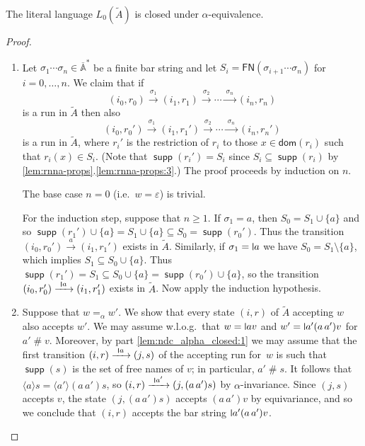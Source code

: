 \documentclass[final,a4paper,UKenglish,thm-restate,autoref,numberwithinsect]{lipics-v2021}
\newcommand{\midmid}{\hspace{0.2ex}{\rule[-0.1ex]{0.6pt}{1.65ex}}\hspace{0.2ex}}
\newcommand{\scriptmidmid}{\hspace{0.2ex}{\rule[-0.1ex]{0.6pt}{1.1ex}}\hspace{0.2ex}}
\newcommand{\newletter}[1]{{\midmid}#1}
\newcommand{\scriptnew}[1]{{\scriptmidmid}#1}
\newcommand{\free}[1]{\mathsf{FN}(#1)}
\newcommand{\barA}{\overline{\names}}
\numberwithin{equation}{section}
\newcommand{\xto}[1]{\xrightarrow{~#1~}}
\newcommand{\seq}{\subseteq}
\newcommand{\tl}{\widetilde}
\newcommand{\braket}[1]{\langle #1 \rangle}
\renewcommand{\epsilon}{\varepsilon}
\newcommand{\+}[1]{\mathcal{#1}\xspace}
\newcommand{\names}{\mathbb{A}}
\DeclareMathOperator{\supp}{\mathsf{supp}} %
\newcommand{\fresh}{\mathbin{\#}}
\theoremstyle{definition}
\begin{document}
\begin{lemma}\label{lem:ndc_alpha_closed}
  The literal language $L_0(\tl A)$ is closed under $\alpha$-equivalence.
\end{lemma}
%
\begin{proof}
  \begin{enumerate}
  \item\label{lem:ndc_alpha_closed:1} Let
    $\sigma_1\cdots \sigma_n\in \barA^*$ be a finite bar string and
    let $S_i=\free{\sigma_{i+1}\cdots \sigma_n}$ for
    $i=0,\ldots,n$. We claim that if
    \[
      (i_0,r_0)\xto{\sigma_1} (i_1, r_1)\xto{\sigma_2} \cdots \xto{\sigma_n} (i_n, r_n)
    \]
    is a run in $\tl{A}$ then also
    \[
      (i_0,r_0')\xto{\sigma_1} (i_1, r_1')\xto{\sigma_2} \cdots \xto{\sigma_n}
      (i_n, r_n')
    \]
    is a run in $\tl{A}$, where $r_i'$ is the restriction of $r_i$ to
    those $x\in \mathsf{dom}(r_i)$ such that $r_i(x)\in S_i$. (Note that
    $\supp(r_i')=S_i$ since $S_i\seq \supp(r_i)$ by \autoref{lem:rnna-props}.\ref{lem:rnna-props:3}.) The proof proceeds by
    induction on $n$.

    \smallskip\noindent The base case $n=0$ (i.e.~$w=\epsilon$) is
    trivial.
  
    \smallskip\noindent For the induction step, suppose that
    $n\geq 1$. If $\sigma_1=a$, then $S_0=S_1\cup \{a\}$ and so
    $\supp(r_1')\cup \{a\}=S_1\cup \{a\}\seq S_0 =\supp(r_0')$. Thus
    the transition $(i_0,r_0')\xto{a}(i_1,r_1')$ exists in
    $\tl{A}$. Similarly, if $\sigma_1=\newletter a$ we have
    $S_0=S_1\setminus \{a\}$, which implies $S_1\seq S_0\cup
    \{a\}$. Thus
    $\supp(r_1')=S_1 \seq S_0\cup \{a\} = \supp(r_0')\cup \{a\}$, so
    the transition $(i_0,r_0')\xto{\scriptnew a}(i_1,r_1')$ exists in
    $\tl{A}$. Now apply the induction hypothesis.

  \item Suppose that $w=_\alpha w'$. We show that every state $(i,r)$ of
    $\tl{A}$ accepting $w$ also accepts $w'$. We may assume w.l.o.g.\
    that $w=\newletter av$ and $w'=\newletter a'(a\, a')v$ for $a'\fresh v$. Moreover, by
    part \ref{lem:ndc_alpha_closed:1} we may assume that the
    first transition $(i,r)\xto{\scriptnew a} (j,s)$ of the accepting run
    for~$w$ is such that $\supp(s)$ is the set of free names of $v$;
    in particular, $a'\fresh s$. It follows that
    $\braket{a} s = \braket{a'} (a\, a')s$, so
    $(i,r)\xto{\scriptnew a'} (j,(a\, a')s)$ by $\alpha$-invariance. Since
    $(j,s)$ accepts $v$, the state $(j,(a\, a')s)$ accepts $(a\, a')v$
    by equivariance, and so we conclude that $(i,r)$ accepts
    the bar string $\newletter a'(a\, a')v$.\qedhere
  \end{enumerate}
\end{proof}
\end{document}
